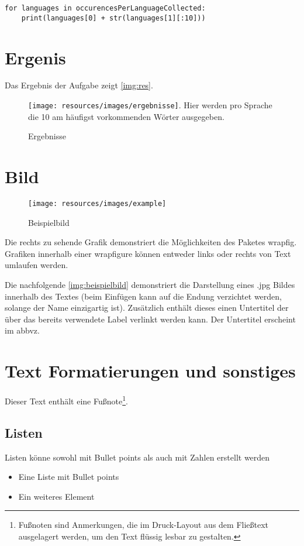 \documentclass[chapterprefix=true, 12pt, a4paper, oneside, parskip=half, listof=totoc, bibliography=totoc, numbers=noendperiod]{scrbook}
\begin{document}
 \begin{lstlisting}[caption={Vorbereitung}, captionpos=b, label={lst:out}]
for languages in occurencesPerLanguageCollected:
    print(languages[0] + str(languages[1][:10]))
\end{lstlisting}


\section{Ergenis}

Das Ergebnis der Aufgabe zeigt \autoref{img:res}. 
\begin{figure}[H]
	\texttt{[image: resources/images/ergebnisse]}. Hier werden pro Sprache die 10 am häufigst vorkommenden Wörter ausgegeben. 
	\caption{Ergebnisse}
	\label{img:ordner}
\end{figure}

\section{Bild}

\begin{wrapfigure}{R}{0.5\textwidth}
	\centering
	\texttt{[image: resources/images/example]}
	\caption{Beispielbild {\cite{PEXELS2015}}}
\end{wrapfigure}

Die rechts zu sehende Grafik demonstriert die Möglichkeiten des Paketes \glqq wrapfig\grqq . Grafiken innerhalb einer \glqq wrapfigure\grqq{} können entweder links oder rechts von Text umlaufen werden.

Die nachfolgende \autoref{img:beispielbild} demonstriert die Darstellung eines \glqq *.jpg\grqq{} Bildes innerhalb des Textes (beim Einfügen kann auf die Endung verzichtet werden, solange der Name einzigartig ist). Zusätzlich enthält dieses einen Untertitel der über das bereits verwendete Label verlinkt werden kann. Der Untertitel erscheint im \gls{abbvz}.

\section{Text Formatierungen und sonstiges}
Dieser Text enthält eine Fußnote\footnote{Fußnoten sind Anmerkungen, die im Druck-Layout aus dem Fließtext ausgelagert werden, um den Text flüssig lesbar zu gestalten.}.

\subsection{Listen}
Listen könne sowohl mit Bullet points als auch mit Zahlen erstellt werden
\begin{itemize}
	\item Eine Liste mit Bullet points
	\item Ein weiteres Element
\end{itemize}
\end{document}
